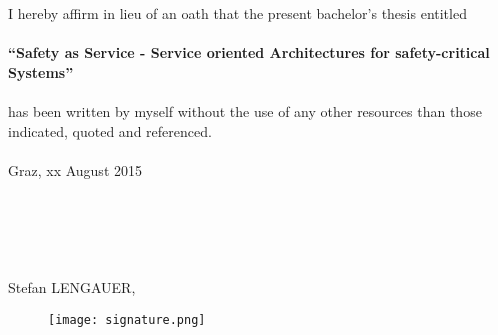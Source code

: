 
I hereby affirm in lieu of an oath that the present bachelor's thesis entitled\\
\\
\textbf{``Safety as Service - Service oriented Architectures for safety-critical Systems''}\\
\\
has been written by myself without the use of any other resources than those indicated, quoted and referenced.\\
\\
Graz, xx August 2015\\
\\
\\
\\
\\
\\
Stefan LENGAUER,
\begin{figure}[ht]
\texttt{[image: signature.png]}
\end{figure}
